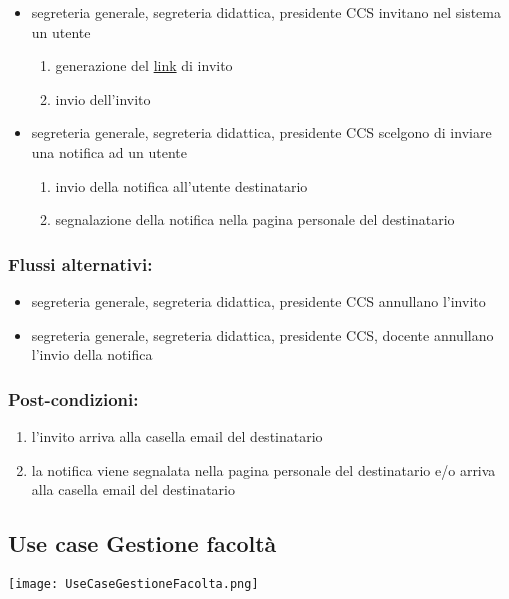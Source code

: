 \documentclass[11pt,a4paper]{article}
\begin{document}
\begin{itemize}
 \item segreteria generale, segreteria didattica, presidente CCS invitano nel sistema un utente
\begin{enumerate}
 \item generazione del \underline{link} di invito
\item invio dell'invito
\end{enumerate}
\item segreteria generale, segreteria didattica, presidente CCS scelgono di inviare una notifica ad un utente
\begin{enumerate}
 \item invio della notifica all'utente destinatario
 \item segnalazione della notifica nella pagina personale del destinatario
\end{enumerate}
\end{itemize}
\subsubsection*{Flussi alternativi:}
\begin{itemize}
 \item segreteria generale, segreteria didattica, presidente CCS annullano l'invito
\item  segreteria generale, segreteria didattica, presidente CCS, docente annullano l'invio della notifica
\end{itemize}
\subsubsection*{Post-condizioni:}
\begin{enumerate}
 \item l'invito arriva alla casella email del destinatario
 \item la notifica viene segnalata nella pagina personale del destinatario e/o arriva alla casella email del destinatario
\end{enumerate}

\subsection{Use case Gestione facoltà}
\begin{center} 
 \texttt{[image: UseCaseGestioneFacolta.png]}
\end{center}
\end{document}
